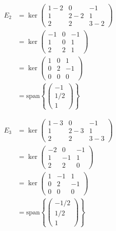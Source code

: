 \documentclass{article}
\begin{document}
\begin{align*}
E_2 &= \ker\begin{pmatrix}
1 - 2 & 0 & -1 \\
1 & 2 - 2 & 1 \\
2 & 2 & 3 - 2
\end{pmatrix} \\
&= \ker\begin{pmatrix}
-1 & 0 & -1 \\
1 & 0 & 1 \\
2 & 2 & 1
\end{pmatrix} \\
&= \ker\begin{pmatrix}
1 & 0 & 1 \\
0 & 2 & -1 \\
0 & 0 & 0
\end{pmatrix} \\
&= \text{span}\left\{\begin{pmatrix}
-1 \\
1/2 \\
1
\end{pmatrix}\right\}
\end{align*}

\begin{align*}
    E_3 &= \ker\begin{pmatrix}
1 - 3 & 0 & -1 \\
1 & 2 - 3 & 1 \\
2 & 2 & 3 - 3
\end{pmatrix} \\
&= \ker\begin{pmatrix}
-2 & 0 & -1 \\
1 & -1 & 1 \\
2 & 2 & 0
\end{pmatrix} \\
&= \ker\begin{pmatrix}
1 & -1 & 1 \\
0 & 2 & -1 \\
0 & 0 & 0
\end{pmatrix} \\
&= \text{span}\left\{\begin{pmatrix}
-1/2 \\
1/2 \\
1
\end{pmatrix}\right\}
\end{align*}
\end{document}
